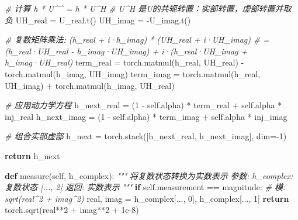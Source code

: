 \documentclass[
  12pt,
]{article}
\newenvironment{Shaded}{}{}
\newcommand{\CommentTok}[1]{\textcolor[rgb]{0.38,0.63,0.69}{\textit{#1}}}
\newcommand{\ControlFlowTok}[1]{\textcolor[rgb]{0.00,0.44,0.13}{\textbf{#1}}}
\newcommand{\DecValTok}[1]{\textcolor[rgb]{0.25,0.63,0.44}{#1}}
\newcommand{\FloatTok}[1]{\textcolor[rgb]{0.25,0.63,0.44}{#1}}
\newcommand{\KeywordTok}[1]{\textcolor[rgb]{0.00,0.44,0.13}{\textbf{#1}}}
\newcommand{\NormalTok}[1]{#1}
\newcommand{\OperatorTok}[1]{\textcolor[rgb]{0.40,0.40,0.40}{#1}}
\newcommand{\StringTok}[1]{\textcolor[rgb]{0.25,0.44,0.63}{#1}}
\newcommand{\VariableTok}[1]{\textcolor[rgb]{0.10,0.09,0.49}{#1}}
\begin{document}
\begin{Shaded}
\begin{Highlighting}[]
        \CommentTok{\# 计算 h * U\^{}^{\dagger} = h * U\^{}H}
        \CommentTok{\# U\^{}H 是U的共轭转置：实部转置，虚部转置并取负}
\NormalTok{        UH\_real }\OperatorTok{=}\NormalTok{ U\_real.t()}
\NormalTok{        UH\_imag }\OperatorTok{=} \OperatorTok{{-}}\NormalTok{U\_imag.t()}
        
        \CommentTok{\# 复数矩阵乘法: (h\_real + i·h\_imag) * (UH\_real + i·UH\_imag)}
        \CommentTok{\# = (h\_real·UH\_real {-} h\_imag·UH\_imag) + i·(h\_real·UH\_imag + h\_imag·UH\_real)}
\NormalTok{        term\_real }\OperatorTok{=}\NormalTok{ torch.matmul(h\_real, UH\_real) }\OperatorTok{{-}}\NormalTok{ torch.matmul(h\_imag, UH\_imag)}
\NormalTok{        term\_imag }\OperatorTok{=}\NormalTok{ torch.matmul(h\_real, UH\_imag) }\OperatorTok{+}\NormalTok{ torch.matmul(h\_imag, UH\_real)}
        
        \CommentTok{\# 应用动力学方程}
\NormalTok{        h\_next\_real }\OperatorTok{=}\NormalTok{ (}\DecValTok{1} \OperatorTok{{-}} \VariableTok{self}\NormalTok{.alpha) }\OperatorTok{*}\NormalTok{ term\_real }\OperatorTok{+} \VariableTok{self}\NormalTok{.alpha }\OperatorTok{*}\NormalTok{ inj\_real}
\NormalTok{        h\_next\_imag }\OperatorTok{=}\NormalTok{ (}\DecValTok{1} \OperatorTok{{-}} \VariableTok{self}\NormalTok{.alpha) }\OperatorTok{*}\NormalTok{ term\_imag }\OperatorTok{+} \VariableTok{self}\NormalTok{.alpha }\OperatorTok{*}\NormalTok{ inj\_imag}
        
        \CommentTok{\# 组合实部虚部}
\NormalTok{        h\_next }\OperatorTok{=}\NormalTok{ torch.stack([h\_next\_real, h\_next\_imag], dim}\OperatorTok{={-}}\DecValTok{1}\NormalTok{)}
        
        \ControlFlowTok{return}\NormalTok{ h\_next}
    
    \KeywordTok{def}\NormalTok{ measure(}\VariableTok{self}\NormalTok{, h\_complex):}
        \CommentTok{"""}
\CommentTok{        将复数状态转换为实数表示}
\CommentTok{        }
\CommentTok{        参数:}
\CommentTok{            h\_complex: 复数状态 [..., 2]}
\CommentTok{        }
\CommentTok{        返回:}
\CommentTok{            实数表示}
\CommentTok{        """}
        \ControlFlowTok{if} \VariableTok{self}\NormalTok{.measurement }\OperatorTok{==} \StringTok{\textquotesingle{}magnitude\textquotesingle{}}\NormalTok{:}
            \CommentTok{\# 模: sqrt(real\^{}2 + imag\^{}2)}
\NormalTok{            real, imag }\OperatorTok{=}\NormalTok{ h\_complex[..., }\DecValTok{0}\NormalTok{], h\_complex[..., }\DecValTok{1}\NormalTok{]}
            \ControlFlowTok{return}\NormalTok{ torch.sqrt(real}\OperatorTok{**}\DecValTok{2} \OperatorTok{+}\NormalTok{ imag}\OperatorTok{**}\DecValTok{2} \OperatorTok{+} \FloatTok{1e{-}8}\NormalTok{)}
        

\end{Highlighting}
\end{Shaded}
\end{document}
